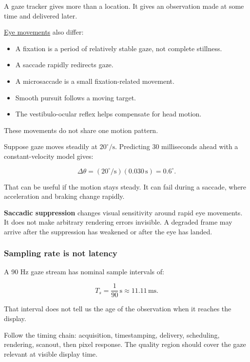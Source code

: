 A gaze tracker gives more than a location. It gives an observation made at some time and delivered later.

\hyperref[appendix-a6f2c4fe1996]{Eye movements} also differ:

\begin{itemize}
\tightlist
\item
  A fixation is a period of relatively stable gaze, not complete stillness.
\item
  A saccade rapidly redirects gaze.
\item
  A microsaccade is a small fixation-related movement.
\item
  Smooth pursuit follows a moving target.
\item
  The vestibulo-ocular reflex helps compensate for head motion.
\end{itemize}

These movements do not share one motion pattern.

Suppose gaze moves steadily at \(20^\circ/\mathrm{s}\). Predicting 30 milliseconds ahead with a constant-velocity model gives:

\[
\Delta\theta
=(20^\circ/\mathrm{s})(0.030\,\mathrm{s})
=0.6^\circ.
\]

That can be useful if the motion stays steady. It can fail during a saccade, where acceleration and braking change rapidly.

\textbf{Saccadic suppression} changes visual sensitivity around rapid eye movements. It does not make arbitrary rendering errors invisible. A degraded frame may arrive after the suppression has weakened or after the eye has landed.

\subsubsection{Sampling rate is not latency}\label{04-visual-computing-ii-ch043-sampling-rate-is-not-latency}

\hypertarget{04-visual-computing-ii-ch043-sampling-rate-is-not-latency}{}

A 90 Hz gaze stream has nominal sample intervals of:

\[
T_s=\frac1{90}\,\mathrm{s}\approx11.11\,\mathrm{ms}.
\]

That interval does not tell us the age of the observation when it reaches the display.

Follow the timing chain: acquisition, timestamping, delivery, scheduling, rendering, scanout, then pixel response. The quality region should cover the gaze relevant at visible display time.

